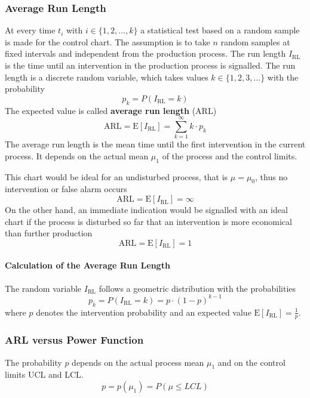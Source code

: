 \documentclass[11pt]{article}
\theoremstyle{definition}
\newcommand*\ev[1]{\mathrel{\text{E}\left[#1\right]}}
\begin{document}
\subsubsection{Average Run Length}
At every time $t_i$ with $i\in\{1,2,\dots,k\}$ a statistical test based on a random sample is made for the control chart. The assumption is to take $n$ random samples at fixed intervals and independent from the production process. The run length $I_{\text{RL}}$ is the time until an intervention in the production process is signalled. The run length is a discrete random variable, which takes values $k\in\{1,2,3,\dots\}$ with the probability
\begin{equation*}
	p_k = P(I_{\text{RL}} = k)
\end{equation*}
The expected value is called \textbf{average run length} (ARL)
\begin{equation*}
	\text{ARL} = \ev{I_{\text{RL}}} = \sum_{k=1}^{\infty} k\cdot p_k
\end{equation*}
The average run length is the mean time until the first intervention in the current process. It depends on the actual mean $\mu_1$ of the process and the control limits.

This chart would be ideal for an undisturbed process, that is $\mu = \mu_0$, thus no intervention or false alarm occurs
\begin{equation*}
	\text{ARL} = \ev{I_{\text{RL}}} = \infty
\end{equation*}
On the other hand, an immediate indication would be signalled with an ideal chart if the process is disturbed so far that an intervention is more economical than further production
\begin{equation*}
	\text{ARL} = \ev{I_{\text{RL}}} = 1
\end{equation*}

\paragraph{Calculation of the Average Run Length} The random variable $I_{\text{RL}}$ follows a geometric distribution with the probabilities
\begin{equation*}
	p_k = P(I_{\text{RL}} = k) = p\cdot(1-p)^{k-1}
\end{equation*}
where $p$ denotes the intervention probability and an expected value $\ev{I_{\text{RL}}} = \frac{1}{p}$.

\subsubsection{ARL versus Power Function}
The probability $p$ depends on the actual process mean $\mu_1$ and on the control limits UCL and LCL.
\begin{equation*}
	p = p(\mu_1) = P(\mu\leq LCL)
\end{equation*}
\end{document}
